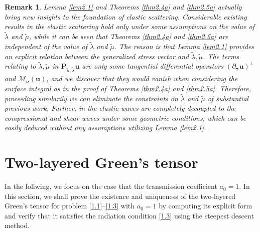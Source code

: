 \documentclass[final,reqno]{siamltex}
\newcommand{\pa}{\partial}
\newtheorem{remark}[theorem]{Remark}
\begin{document}
\begin{remark}\label{rem2.6}
	Lemma {\rm \ref{lem2.1}} and Theorems {\rm \ref{thm2.4a}} and {\rm \ref{thm2.5a}} actually bring new insights to the foundation of elastic scattering. Considerable existing results in the elastic scattering hold only under some assumptions on the value of $\tilde\lambda$ and $\tilde\mu$, while it can be seen that Theorems {\rm \ref{thm2.4a}} and {\rm \ref{thm2.5a}} are independent of the value of $\tilde\lambda$ and $\tilde\mu$. The reason is that Lemma {\rm \ref{lem2.1}} provides an explicit relation between the generalized stress vector and $\tilde\lambda, \tilde\mu$. The terms relating to $\tilde\lambda, \tilde\mu$ in $\mathbf{P}_{\tilde{\mu},\tilde{\lambda}}\mathbf{u}$ are only some tangential differential operators $(\pa_{\boldsymbol{\tau}}\mathbf{u})^\perp$ and $\mathcal{M}_{\boldsymbol{\nu}}(\mathbf{u})$, and we discover that they would vanish when considering the surface integral as in the proof of Theorems {\rm \ref{thm2.4a}} and {\rm \ref{thm2.5a}}. Therefore, proceeding similarily we can eliminate the constraints on $\tilde\lambda$ and $\tilde\mu$ of substantial previous work. Further, in {\rm \cite{HJ17}} the elastic waves are completely decoupled to the compressional and shear waves under some geometric conditions, which can be easily deduced without any assumptions utilizing Lemma {\rm \ref{lem2.1}}. 
\end{remark}




\section{Two-layered Green's tensor}\label{sec3}
\setcounter{equation}{0}
In the follwing, we focus on the case that the transmission coefficient $a_0=1$. In this section, we shall prove the existence and uniqueness of the two-layered Green's tensor for problem \eqref{1.1}--\eqref{1.3} with $a_0=1$ by computing its explicit form and verify that it satisfies the radiation condition \eqref{1.3} using the steepest descent method. 
\end{document}
